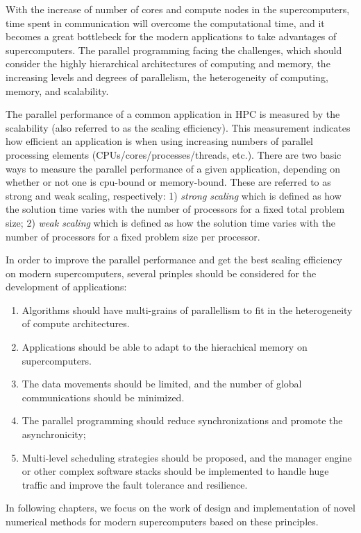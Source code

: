 With the increase of number of cores and compute nodes in the supercomputers, time spent in communication will overcome the computational time, and it becomes a great bottlebeck for the modern applications to take advantages of supercomputers. The parallel programming facing the challenges, which should consider the highly hierarchical architectures of computing and memory, the increasing levels and degrees of parallelism, the heterogeneity of computing, memory, and scalability.

The parallel performance of a common application in HPC is measured by the scalability (also referred to as the scaling efficiency). This measurement indicates how efficient an application is when using increasing numbers of parallel processing elements (CPUs/cores/processes/threads, etc.). There are two basic ways to measure the parallel performance of a given application, depending on whether or not one is cpu-bound or memory-bound. These are referred to as strong and weak scaling, respectively: 1) \textit{strong scaling} which is defined as how the solution time varies with the number of processors for a fixed total problem size; 2) \textit{weak scaling} which is defined as how the solution time varies with the number of processors for a fixed problem size per processor.

In order to improve the parallel performance and get the best scaling efficiency on modern supercomputers, several prinples should be considered for the development of applications:

	\begin{enumerate}
		\item Algorithms should have multi-grains of parallellism to fit in the heterogeneity of compute architectures.
		\item Applications should be able to adapt to the hierachical memory on supercomputers.
		\item The data movements should be limited, and the number of global communications should be minimized.
		\item The parallel programming should reduce synchronizations and promote the asynchronicity;
		\item Multi-level scheduling strategies should be proposed,  and the manager engine or other complex software stacks should be implemented to handle huge traffic and improve the fault tolerance and resilience.
	\end{enumerate}

In following chapters, we focus on the work of design and implementation of novel numerical methods for modern supercomputers based on these principles.

\clearemptydoublepage